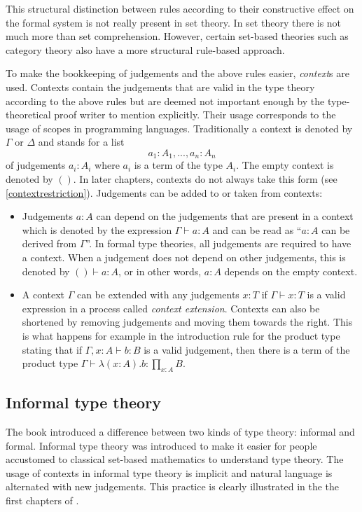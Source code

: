 \documentclass[12pt,a4paper,twoside,xetex]{book} %
\newcommand{\keyword}[1]{\emph{#1}\index{#1}}
\begin{document}
This structural distinction between rules according to their 
constructive effect on the formal system is not really present in set theory. In 
set theory there is not much more than set comprehension. However, certain 
set-based theories such as category theory also have a more structural 
rule-based approach. 

To make the bookkeeping of judgements and the above  rules easier, 
\keyword{context}s are used. Contexts contain the judgements that are valid in 
the type theory according to the above rules but are deemed not 
important enough by the type-theoretical proof writer to mention explicitly. 
Their usage corresponds to the usage of scopes in programming languages. 
Traditionally a context is denoted by $\Gamma$ or $\Delta$ and stands for a list 
$$a_1:A_1,...,a_n:A_n$$ of judgements $a_i : A_i$ where $a_i$ is a term of the type 
$A_i$.  The empty context is denoted by $()$. In later chapters, contexts do not 
always take this form (see \cref{contextrestriction}). Judgements can be added to 
or taken from contexts:

\begin{itemize}
\item Judgements $a : A$ can depend on the judgements that are present in a 
context which is denoted by the expression $\Gamma \vdash a : A$ and can be read as ``$a:A$ can be derived from $\Gamma$''. In formal 
type theories, all judgements are required to have a context. When a judgement 
does not depend on other judgements, this is denoted by $() \vdash a : A$, or 
in other words, $a : A$ depends on the empty context.  
\item A context $\Gamma$ can be extended with any judgements $x:T$ if $\Gamma 
\vdash x : T$ is a valid expression in a process called \keyword{context 
extension}. Contexts can also be shortened by removing judgements and moving them 
towards the right. This is what happens for example in the introduction rule for 
the product type stating that if $\Gamma , x : A \vdash b : B$ is a valid 
judgement, then there is a term of the product type $\Gamma \vdash \lambda (x : 
A) . b : \prod_{x : A} B$.
\end{itemize}




\subsection{Informal type theory}\label{informal}

The book \cite{Voevodsky2013} introduced a difference between two kinds of type 
theory: informal and formal. Informal type theory was introduced to make it 
easier for people accustomed to classical set-based mathematics to understand 
type theory. The usage of contexts in informal type theory is implicit and 
natural language is alternated with new judgements. This practice is clearly 
illustrated in the the first chapters of \cite{Voevodsky2013}.
\end{document}

